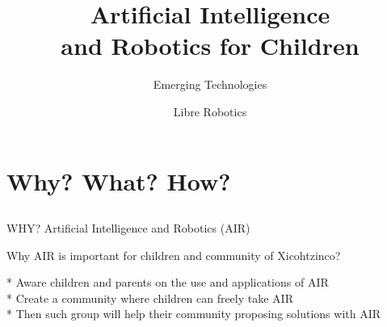 \documentclass[compress]{beamer}
\title{Artificial Intelligence \\
and Robotics for Children}
\subtitle{Emerging Technologies}
\author{Libre Robotics}
\institute{Department of \\{\bf University of }}
\begin{document}



\closingtitle







\section{Why? What? How?}



\subsection{}
{
\begin{frame}{WHY? Artificial Intelligence and Robotics (AIR)}

Why AIR is important for children and community of Xicohtzinco?

* Aware children and parents on the use and applications of AIR \\ 
* Create a community where children can freely take AIR  \\   
* Then such group will help their community proposing solutions with AIR    \\




\end{frame}
}
\end{document}
